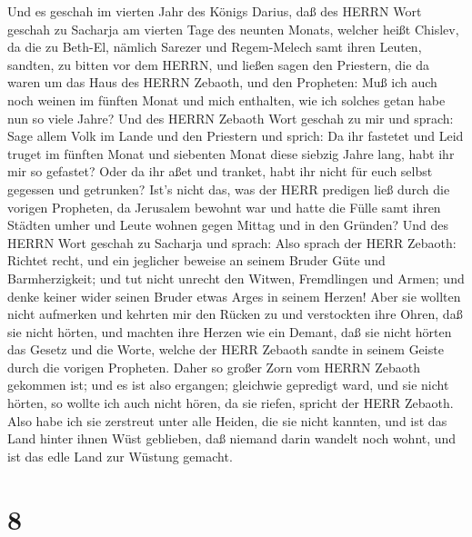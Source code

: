  Und es geschah im vierten Jahr des Königs Darius, daß des
HERRN Wort geschah zu Sacharja am vierten Tage des neunten Monats,
welcher heißt Chislev,  da die zu Beth-El, nämlich Sarezer
und Regem-Melech samt ihren Leuten, sandten, zu bitten vor dem HERRN,
 und ließen sagen den Priestern, die da waren um das Haus
des HERRN Zebaoth, und den Propheten: Muß ich auch noch weinen im
fünften Monat und mich enthalten, wie ich solches getan habe nun so
viele Jahre?  Und des HERRN Zebaoth Wort geschah zu mir und
sprach:  Sage allem Volk im Lande und den Priestern und
sprich: Da ihr fastetet und Leid truget im fünften Monat und siebenten
Monat diese siebzig Jahre lang, habt ihr mir so gefastet? 
Oder da ihr aßet und tranket, habt ihr nicht für euch selbst gegessen
und getrunken?  Ist's nicht das, was der HERR predigen ließ
durch die vorigen Propheten, da Jerusalem bewohnt war und hatte die
Fülle samt ihren Städten umher und Leute wohnen gegen Mittag und in den
Gründen?  Und des HERRN Wort geschah zu Sacharja und sprach:
 Also sprach der HERR Zebaoth: Richtet recht, und ein
jeglicher beweise an seinem Bruder Güte und Barmherzigkeit;
 und tut nicht unrecht den Witwen, Fremdlingen und Armen;
und denke keiner wider seinen Bruder etwas Arges in seinem Herzen!
 Aber sie wollten nicht aufmerken und kehrten mir den
Rücken zu und verstockten ihre Ohren, daß sie nicht hörten,
 und machten ihre Herzen wie ein Demant, daß sie nicht
hörten das Gesetz und die Worte, welche der HERR Zebaoth sandte in
seinem Geiste durch die vorigen Propheten. Daher so großer Zorn vom
HERRN Zebaoth gekommen ist;  und es ist also ergangen;
gleichwie gepredigt ward, und sie nicht hörten, so wollte ich auch nicht
hören, da sie riefen, spricht der HERR Zebaoth.  Also habe
ich sie zerstreut unter alle Heiden, die sie nicht kannten, und ist das
Land hinter ihnen Wüst geblieben, daß niemand darin wandelt noch wohnt,
und ist das edle Land zur Wüstung gemacht.

\hypertarget{section-7}{%
\section{8}\label{section-7}}

